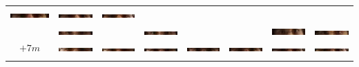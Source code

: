 \begin{tabular}{|c|c|c|c|c|c|c|c|}
\includegraphics[width=0.115\linewidth]{Auge1/A_Img8-5FalkoE.png} &
\includegraphics[width=0.115\linewidth]{Auge1/A_Img8-6FalkoE.png} &
\includegraphics[width=0.115\linewidth]{Auge1/A_Img8-7FalkoE.png} \\&
\includegraphics[width=0.115\linewidth]{Auge1/A_Img8-1ThomasE.png} &
&
\includegraphics[width=0.115\linewidth]{Auge1/A_Img8-3ThomasE.png} &
&
&
\includegraphics[width=0.115\linewidth]{Auge1/A_Img8-6ThomasE.png} &
\includegraphics[width=0.115\linewidth]{Auge1/A_Img8-7ThomasE.png} \\\hline 
$+7m$&
\includegraphics[width=0.115\linewidth]{Auge1/A_Img7-1FalkoE.png} &
\includegraphics[width=0.115\linewidth]{Auge1/A_Img7-2FalkoE.png} &
\includegraphics[width=0.115\linewidth]{Auge1/A_Img7-3FalkoE.png} &
\includegraphics[width=0.115\linewidth]{Auge1/A_Img7-4FalkoE.png} &
\includegraphics[width=0.115\linewidth]{Auge1/A_Img7-5FalkoE.png} &
\includegraphics[width=0.115\linewidth]{Auge1/A_Img7-6FalkoE.png} &
\includegraphics[width=0.115\linewidth]{Auge1/A_Img7-7FalkoE.png} \\&

\end{tabular}
